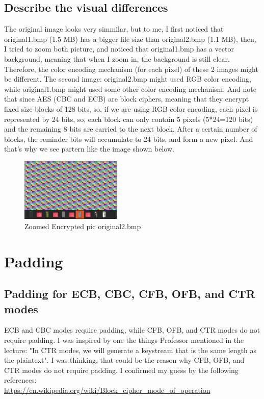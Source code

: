 \documentclass{article}
\begin{document}
\subsection{Describe the visual differences}
The original image looks very simmilar, but to me, I first noticed that original1.bmp (1.5 MB) has a bigger file size
than original2.bmp (1.1 MB), then, I tried to zoom both picture, and noticed that original1.bmp has a vector background,
meaning that when I zoom in, the background is still clear.\\
Therefore, the color encoding mechanism (for each pixel) of these 2 images might be different. The second image:
original2.bmp might used RGB color encoding, while original1.bmp might used some other color encoding mechanism.
And note that since AES (CBC and ECB) are block ciphers, meaning that they encrypt fixed size blocks of 128 bits,
so, if we are using RGB color encoding, each pixel is represented by 24 bits, so, each block can only contain
5 pixels (5*24=120 bits) and the remaining 8 bits are carried to the next block. After a certain number of blocks,
the reminder bits will accumulate to 24 bits, and form a new pixel. And that's why we see partern like the image
shown below.\\
\begin{figure}[h]
    \centering
    \includegraphics[height=3cm]{images/slash_pattern.png}
    \caption{Zoomed Encrypted pic original2.bmp}
\end{figure}

\section{Padding}
\subsection{Padding for ECB, CBC, CFB, OFB, and CTR modes}
ECB and CBC modes require padding, while CFB, OFB, and CTR modes do not require padding. I was inspired by one the things
Professor mentioned in the lecture: "In CTR modes, we will generate a keystream that is the same length as the plaintext".
I was thinking, that could be the reason why CFB, OFB, and CTR modes do not require padding. I confirmed my guess by
the following references:\\
\url{https://en.wikipedia.org/wiki/Block_cipher_mode_of_operation}\\
\end{document}

